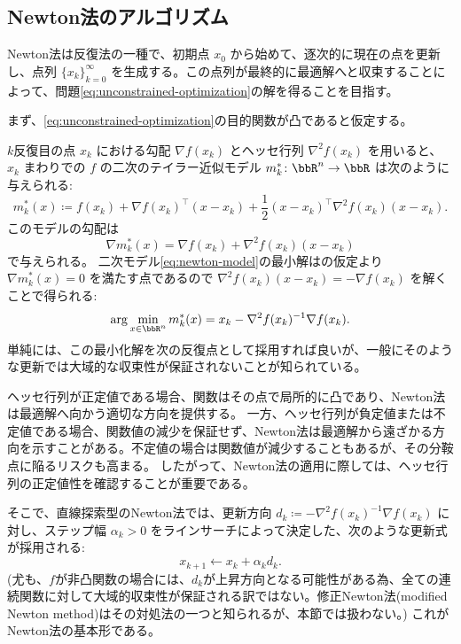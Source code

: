 \documentclass[a4paper, 10pt, dvipdfmx,draft]{article}
\begin{document}
\subsection{Newton法のアルゴリズム}

Newton法は反復法の一種で、初期点 $x_0$ から始めて、逐次的に現在の点を更新し、点列 $\{x_k\}_{k=0}^\infty$ を生成する。この点列が最終的に最適解へと収束することによって、問題\cref{eq:unconstrained-optimization}の解を得ることを目指す。

まず、\cref{eq:unconstrained-optimization}の目的関数が凸であると仮定する。

$k$反復目の点 $x_k$ における勾配 $\nabla f(x_k)$ とヘッセ行列 $\nabla^2 f(x_k)$ を用いると、$x_k$ まわりでの $f$ の二次のテイラー近似モデル $m^*_k \colon \bbR^n \to \bbR$ は次のように与えられる:
\begin{equation}\label{eq:newton-model}
    m^*_{k}(x) \coloneqq f(x_k) + \nabla f(x_k)^\top (x - x_k) + \frac{1}{2} (x - x_k)^\top \nabla^2 f(x_k) (x - x_k).
\end{equation}
このモデルの勾配は
\begin{equation}\label{eq:newton-model-gradient}
    \nabla m^*_k(x) = \nabla f(x_k) + \nabla^2 f(x_k)(x - x_k)
\end{equation}
で与えられる。
二次モデル\cref{eq:newton-model}の最小解はの仮定より $\nabla m^*_k(x) = 0$ を満たす点であるので $\nabla^2 f(x_k)(x - x_k) = -\nabla f(x_k)$ を解くことで得られる:
\begin{equation*}
    \arg\min_{x\in\bbR^n} m^*_{k}(x) = x_k -\nabla^2 f(x_k)^{-1}\nabla f(x_k).
\end{equation*}
単純には、この最小化解を次の反復点として採用すれば良いが、一般にそのような更新では大域的な収束性が保証されないことが知られている。

ヘッセ行列が正定値である場合、関数はその点で局所的に凸であり、Newton法は最適解へ向かう適切な方向を提供する。
一方、ヘッセ行列が負定値または不定値である場合、関数値の減少を保証せず、Newton法は最適解から遠ざかる方向を示すことがある。不定値の場合は関数値が減少することもあるが、その分鞍点に陥るリスクも高まる。
したがって、Newton法の適用に際しては、ヘッセ行列の正定値性を確認することが重要である。

そこで、直線探索型のNewton法では、更新方向 $d_k \coloneqq -\nabla^2 f(x_k)^{-1}\nabla f(x_k)$ に対し、ステップ幅 $\alpha_k>0$ をラインサーチによって決定した、次のような更新式が採用される:
\begin{equation*}
    x_{k+1} \gets x_k + \alpha_k d_k.
\end{equation*}
(尤も、$f$が非凸関数の場合には、$d_k$が上昇方向となる可能性がある為、全ての連続関数に対して大域的収束性が保証される訳ではない。修正Newton法(modified Newton method)\citep[Sec. 3.4]{nocedal1999numerical}はその対処法の一つと知られるが、本節では扱わない。)
これがNewton法の基本形である。
\end{document}
